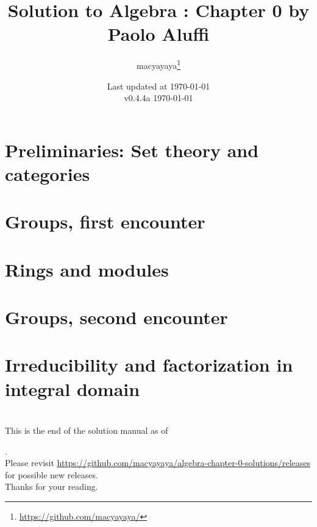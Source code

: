 \documentclass[12pt,a4paper,dvipsnames,oneside]{book}
\title{Solution to Algebra : Chapter 0 by Paolo Aluffi}
\author{macyayaya\thanks{\href{https://github.com/macyayaya/}{https://github.com/macyayaya/}}}
\date{Last updated at \today \\
v0.4.4a
}
\theoremstyle{definition}
\begin{document}
\frontmatter
\maketitle

\tableofcontents
\mainmatter
\chapter{Preliminaries: Set theory and categories}

\newpage
\chapter{Groups, first encounter}

\newpage  
\chapter{Rings and modules}

\newpage
\chapter{Groups, second encounter}

\newpage
\chapter{Irreducibility and factorization in integral domain}

\newpage

\backmatter
\chapter{}
\thispagestyle{empty}
\begin{center}
\large{
This is the end of the solution manual as of \date{\today}. \\
Please revisit \href{https://github.com/macyayaya/algebra-chapter-0-solutions/releases}{https://github.com/macyayaya/algebra-chapter-0-solutions/releases} \\
for possible new releases. \\
Thanks for your reading.
}
\end{center}
\end{document}
